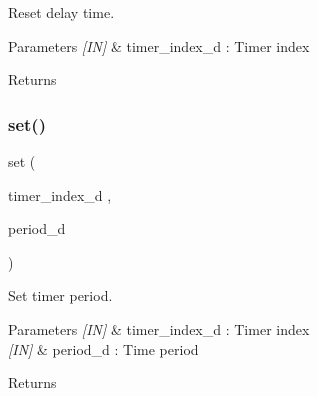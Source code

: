 Reset delay time. 


\begin{DoxyCode}{0}
\DoxyCodeLine{\{}
\DoxyCodeLine{\}}
\end{DoxyCode}



\begin{DoxyParams}{Parameters}
{\em \mbox{[}\+I\+N\mbox{]}} & timer\+\_\+index\+\_\+d \+: Timer index \\
\hline
\end{DoxyParams}
\begin{DoxyReturn}{Returns}

\end{DoxyReturn}
\mbox{\label{classtimer_a37c498555337bd601238a201c554138d}} 
\subsubsection{set()}
{\footnotesize\ttfamily set (\begin{DoxyParamCaption}\item[{timer\+\_\+index\+\_\+d}]{,  }\item[{period\+\_\+d}]{ }\end{DoxyParamCaption})}



Set timer period. 


\begin{DoxyCode}{0}
\DoxyCodeLine{\{}
\DoxyCodeLine{\}}
\end{DoxyCode}



\begin{DoxyParams}{Parameters}
{\em \mbox{[}\+I\+N\mbox{]}} & timer\+\_\+index\+\_\+d \+: Timer index \\
\hline
{\em \mbox{[}\+I\+N\mbox{]}} & period\+\_\+d \+: Time period \\
\hline
\end{DoxyParams}
\begin{DoxyReturn}{Returns}

\end{DoxyReturn}
\mbox{\label{classtimer_aaf5aeaf4819a76289ce5038be1722739}} 
